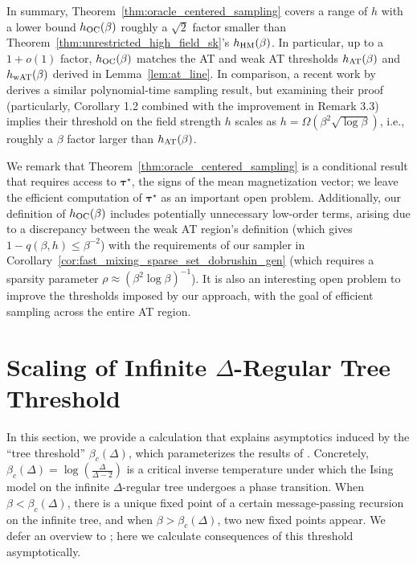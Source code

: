 \documentclass[11pt]{article}
\newcommand{\1}{\mathbf{1}}
\newcommand{\0}{\mathbf{0}}
\newcommand{\vtau}{\boldsymbol{\tau}}
\newcommand{\wAT}{_{\rm wAT}}
\newcommand{\AT}{_{\rm AT}}
\newcommand{\OC}{_{\rm OC}}
\newcommand{\HM}{_{\rm HM}}
\begin{document}
In summary, Theorem~\ref{thm:oracle_centered_sampling} covers a range of $h$ with a lower bound $h\OC(\beta)$ roughly a $\sqrt{2}$ factor smaller than Theorem~\ref{thm:unrestricted_high_field_sk}'s $h\HM(\beta)$. In particular, up to a $1 + o(1)$ factor, $h\OC(\beta)$ matches the AT and weak AT thresholds $h\AT(\beta)$ and $h\wAT(\beta)$ derived in Lemma~\ref{lem:at_line}. In comparison, a recent work by \cite{BandeiraElAlaouiRodder26} derives a similar polynomial-time sampling result, but examining their proof (particularly, Corollary 1.2 combined with the improvement in Remark 3.3) implies their threshold on the field strength $h$ scales as $h = \Omega(\beta^2 \sqrt{\log \beta})$, i.e., roughly a $\beta$ factor larger than $h\AT(\beta)$.

We remark that Theorem~\ref{thm:oracle_centered_sampling} is a conditional result that requires access to $\vtau^\star$, the signs of the mean magnetization vector; we leave the efficient computation of $\vtau^\star$ as an important open problem. Additionally, our definition of $h\OC(\beta)$ includes potentially unnecessary low-order terms, arising due to a discrepancy between the weak AT region's definition (which gives $1 - q(\beta, h) \le \beta^{-2}$) with the requirements of our sampler in Corollary~\ref{cor:fast_mixing_sparse_set_dobrushin_gen} (which requires a sparsity parameter $\rho \approx (\beta^2 \log \beta)^{-1}$). It is also an interesting open problem to improve the thresholds imposed by our approach, with the goal of efficient sampling across the entire AT region.
\section{Scaling of Infinite $\Delta$-Regular Tree Threshold}\label{app:critical}

In this section, we provide a calculation that explains asymptotics induced by the ``tree threshold'' $\beta_c(\Delta)$, which parameterizes the results of  \cite{Carlson2022, KuchukovaPappikPerkinsYap2025}. Concretely, $\beta_c(\Delta) = \log(\frac \Delta {\Delta - 2})$ is a critical inverse temperature under which the Ising model on the infinite $\Delta$-regular tree undergoes a phase transition. When $\beta < \beta_c(\Delta)$, there is a unique fixed point of a certain message-passing recursion on the infinite tree, and when $\beta > \beta_c(\Delta)$, two new fixed points appear. We defer an overview to \cite{Lyons89, Mossel06}; here we calculate consequences of this threshold asymptotically.
\end{document}
